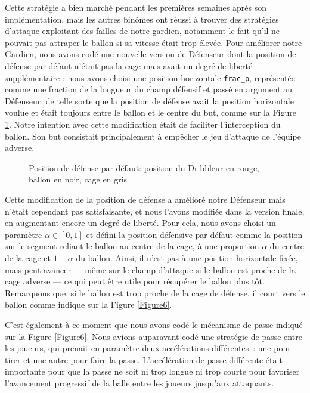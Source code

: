 \documentclass[a4paper,12pt]{article}
\numberwithin{equation}{section}
\begin{document}
Cette stratégie a bien marché pendant les premières semaines après son implémentation, mais les autres binômes ont réussi à trouver des stratégies d'attaque exploitant des failles de notre gardien, notamment le fait qu'il ne pouvait pas attraper le ballon si sa vitesse était trop élevée. Pour améliorer notre Gardien, nous avons codé une nouvelle version de Défenseur dont la position de défense par défaut n'était pas la cage mais avait un degré de liberté supplémentaire : nous avons choisi une position horizontale \texttt{frac\_p}, représentée comme une fraction de la longueur du champ défensif et passé en argument au Défenseur, de telle sorte que la position de défense avait la position horizontale voulue et était toujours entre le ballon et le centre du but, comme sur la Figure \ref{Figure8}. Notre intention avec cette modification était de faciliter l'interception du ballon. Son but consistait principalement à empêcher le jeu d'attaque de l'équipe adverse.

\begin{figure}[ht]
\centering

\caption{Position de défense par défaut: position du Dribbleur en rouge, ballon en noir, cage en gris}
\label{Figure8}
\end{figure}

Cette modification de la position de défense a amélioré notre Défenseur mais n'était cependant pas satisfaisante, et nous l'avons modifiée dans la version finale, en augmentant encore un degré de liberté. Pour cela, nous avons choisi un paramètre $\alpha \in [0, 1]$ et défini la position défensive par défaut comme la position sur le segment reliant le ballon au centre de la cage, à une proportion $\alpha$ du centre de la cage et $1 - \alpha$ du ballon. Ainsi, il n'est pas à une position horizontale fixée, mais peut avancer --- même sur le champ d'attaque si le ballon est proche de la cage adverse --- ce qui peut être utile pour récupérer le ballon plus tôt. Remarquons que, si le ballon est trop proche de la cage de défense, il court vers le ballon comme indique sur la Figure \ref{Figure6}.

C'est également à ce moment que nous avons codé le mécanisme de passe indiqué sur la Figure \ref{Figure6}. Nous avions auparavant codé une stratégie de passe entre les joueurs, qui prenait en paramètre deux accélérations différentes : une pour tirer et une autre pour faire la passe. L'accélération de passe différente était importante pour que la passe ne soit ni trop longue ni trop courte pour favoriser l’avancement progressif de la balle entre les joueurs jusqu’aux attaquants. 
\end{document}
